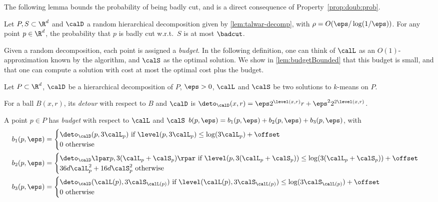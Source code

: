 The following lemma bounds the probability of being badly cut, and is a direct consequence of Property~\ref{prop:doub:prob}.
\begin{lemma}\label{lem:badlycutddim}
  Let $P, S \subset \R^d$ and $\calD$ a random hierarchical 
  decomposition given by \cref{lem:talwar-decomp}, with $\rho = O(\eps/\log(1/\eps))$.
 For any point $p \in \R^d$, the probability that $p$ is badly cut w.r.t.\  $S$
  is at most $\badcut$.
\end{lemma}




Given a random decomposition, each point is assigned a \emph{budget}. In the following definition, one can think of $\calL$ as an $O(1)$-approximation known by the algorithm, and $\calS$ as the optimal solution. We show in \cref{lem:budgetBounded} that this budget is small, and that one can compute a solution with cost at most the optimal cost plus the budget.

\begin{definition}\label{def:budget}
Let $P\subset \R^d$, $\calD$ be 
a hierarchical decomposition of $P$, $\eps > 0$, $\calL$ and $\calS$ be two 
solutions to $k$-means on $P$. 

For a ball $B(x, r)$, its \emph{detour } with respect to $B$ and $\calD$ is $\deto_\calD(x, r) = \eps 2^{\level(x, r)} r + \eps^2 2^{2\level(x, r)}$.

A point $p\in P$ has \emph{budget} with respect to $\calL$ and $\calS$ $b(p, \eps) = b_1(p, \eps) + b_2(p, \eps) + b_3(p, \eps)$, with
\begin{align*}
    b_1(p, \eps) &= \begin{cases} 
 \deto_\calD(p, 3\calL_p)\text{ if } \level(p, 3\calL_p)\leq \log(3\calL_p) + \offset \\
  0\text{ otherwise }
\end{cases}
\\
b_2(p, \eps) &= \begin{cases} 
\deto_\calD\lpar p, 3(\calL_p + \calS_p)\rpar
 \text{ if } \level(p, 3(\calL_p + \calS_p))\leq \log(3(\calL_p + \calS_p)) + \offset \\
 36 d  \calL_p^2 +  16  d \calS_p^2 \text{ otherwise }
\end{cases}
\\
b_3(p, \eps) &= \begin{cases} 
\deto_\calD(\calL(p),  3\calS_{\calL(p)})
 \text{ if } \level(\calL(p), 3\calS_{\calL(p)})\leq \log(3\calS_{\calL(p)}) + \offset \\
 0 \text{ otherwise }
\end{cases}
\end{align*}
\end{definition}


